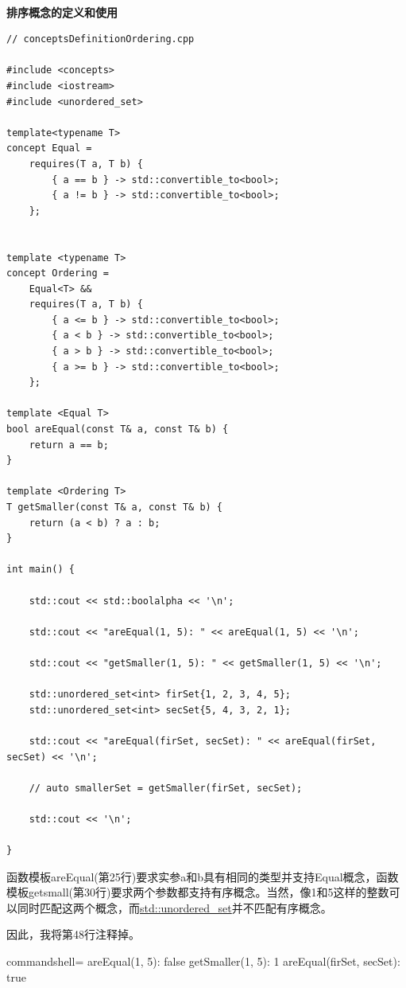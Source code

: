 \hspace*{\fill} \\ %
\noindent
\textbf{排序概念的定义和使用}
\begin{lstlisting}[style=styleCXX]
// conceptsDefinitionOrdering.cpp

#include <concepts>
#include <iostream>
#include <unordered_set>

template<typename T>
concept Equal =
	requires(T a, T b) {
		{ a == b } -> std::convertible_to<bool>;
		{ a != b } -> std::convertible_to<bool>;
	};


template <typename T>
concept Ordering =
	Equal<T> &&
	requires(T a, T b) {
		{ a <= b } -> std::convertible_to<bool>;
		{ a < b } -> std::convertible_to<bool>;
		{ a > b } -> std::convertible_to<bool>;
		{ a >= b } -> std::convertible_to<bool>;
	};

template <Equal T>
bool areEqual(const T& a, const T& b) {
	return a == b;
}

template <Ordering T>
T getSmaller(const T& a, const T& b) {
	return (a < b) ? a : b;
}

int main() {

	std::cout << std::boolalpha << '\n';

	std::cout << "areEqual(1, 5): " << areEqual(1, 5) << '\n';

	std::cout << "getSmaller(1, 5): " << getSmaller(1, 5) << '\n';

	std::unordered_set<int> firSet{1, 2, 3, 4, 5};
	std::unordered_set<int> secSet{5, 4, 3, 2, 1};

	std::cout << "areEqual(firSet, secSet): " << areEqual(firSet, secSet) << '\n';

	// auto smallerSet = getSmaller(firSet, secSet);

	std::cout << '\n';

}
\end{lstlisting}

函数模板areEqual(第25行)要求实参a和b具有相同的类型并支持Equal概念，函数模板getsmall(第30行)要求两个参数都支持有序概念。当然，像1和5这样的整数可以同时匹配这两个概念，而\href{https://en.cppreference.com/w/cpp/container/unordered_set}{std::unordered\_set}并不匹配有序概念。

因此，我将第48行注释掉。

\begin{tcblisting}{commandshell={}}
areEqual(1, 5): false
getSmaller(1, 5): 1
areEqual(firSet, secSet): true
\end{tcblisting}

